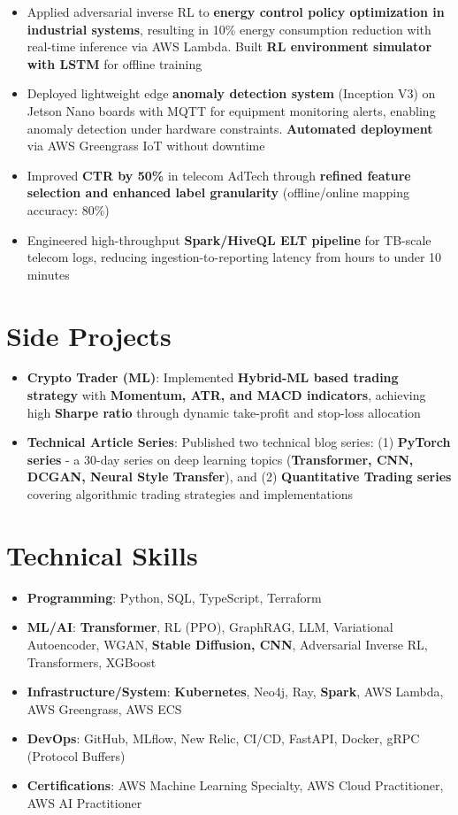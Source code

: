 \documentclass[a4paper,9pt]{extarticle}
\begin{document}
\begin{itemize}[leftmargin=1em,itemsep=0.15em,parsep=0pt]
    \item Applied adversarial inverse RL to \textbf{energy control policy optimization in industrial systems}, resulting in 10\% energy consumption reduction with real-time inference via AWS Lambda. Built \textbf{RL environment simulator with LSTM} for offline training
    \item Deployed lightweight edge \textbf{anomaly detection system} (Inception V3) on Jetson Nano boards with MQTT for equipment monitoring alerts, enabling anomaly detection under hardware constraints. \textbf{Automated deployment} via AWS Greengrass IoT without downtime
    \item Improved \textbf{CTR by 50\%} in telecom AdTech through \textbf{refined feature selection and enhanced label granularity} (offline/online mapping accuracy: 80\%)
    \item Engineered high-throughput \textbf{Spark/HiveQL ELT pipeline} for TB-scale telecom logs, reducing ingestion-to-reporting latency from hours to under 10 minutes
\end{itemize}

\section*{Side Projects}
\begin{itemize}[leftmargin=1em,itemsep=0.15em,parsep=0pt]
    \item \textbf{Crypto Trader (ML)}: Implemented \textbf{Hybrid-ML based trading strategy} with \textbf{Momentum, ATR, and MACD indicators}, achieving high \textbf{Sharpe ratio} through dynamic take-profit and stop-loss allocation
    \item \textbf{Technical Article Series}: Published two technical blog series: (1) \textbf{PyTorch series} - a 30-day series on deep learning topics (\textbf{Transformer, CNN, DCGAN, Neural Style Transfer}), and (2) \textbf{Quantitative Trading series} covering algorithmic trading strategies and implementations
\end{itemize}

\section*{Technical Skills}
\begin{itemize}[leftmargin=1em,itemsep=0.15em,parsep=0pt]
    \item \textbf{Programming}: Python, SQL, TypeScript, Terraform
    \item \textbf{ML/AI}: \textbf{Transformer}, RL (PPO), GraphRAG, LLM, Variational Autoencoder, WGAN, \textbf{Stable Diffusion, CNN}, Adversarial Inverse RL, Transformers, XGBoost
    \item \textbf{Infrastructure/System}: \textbf{Kubernetes}, Neo4j, Ray, \textbf{Spark}, AWS Lambda, AWS Greengrass, AWS ECS
    \item \textbf{DevOps}: GitHub, MLflow, New Relic, CI/CD, FastAPI, Docker, gRPC (Protocol Buffers)
    \item \textbf{Certifications}: AWS Machine Learning Specialty, AWS Cloud Practitioner, AWS AI Practitioner
\end{itemize}
\end{document}
